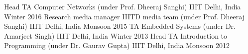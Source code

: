 \begin{cventries}
  \cventry
    {Head TA}
    {Computer Networks (under Prof. Dheeraj Sanghi)}
    {IIIT Delhi, India}
    {Winter 2016}
    {}
    \cventry
    {Research media manager}
    {IIITD media team (under Prof. Dheeraj Sanghi)}
    {IIIT Delhi, India}
    {Monsoon 2015}
    {}
    \cventry
  {TA}
 {Embedded Systems (under Dr. Amarjeet Singh)}
 {IIIT Delhi, India}
 {Winter 2013}
 {}
 \cventry
  {Head TA}
  {Introduction to Programming (under Dr. Gaurav Gupta)}
  {IIIT Delhi, India}
  {Monsoon 2012}
  {}
 
  
\end{cventries}
